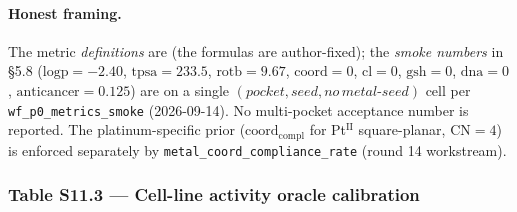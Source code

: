 \paragraph{Honest framing.}
The metric \emph{definitions} are \DESIGN{} (the formulas are
author-fixed); the \emph{smoke numbers} in §5.8
($\text{logp}=-2.40$, $\text{tpsa}=233.5$, $\text{rotb}=9.67$,
$\text{coord}=0$, $\text{cl}=0$, $\text{gsh}=0$, $\text{dna}=0$,
$\text{anticancer}=0.125$) are \MEASURED{} on a single
$(pocket, seed, no\,metal\text{-}seed)$ cell per
\texttt{wf\_p0\_metrics\_smoke} (2026-09-14).  No multi-pocket
acceptance number is reported.  The platinum-specific prior
($\text{coord}_{\text{compl}}$ for Pt$^{\text{II}}$ square-planar,
CN$=4$) is enforced separately by
\texttt{metal\_coord\_compliance\_rate} (round 14 workstream).


\subsubsection*{Table S11.3 --- Cell-line activity oracle calibration}

